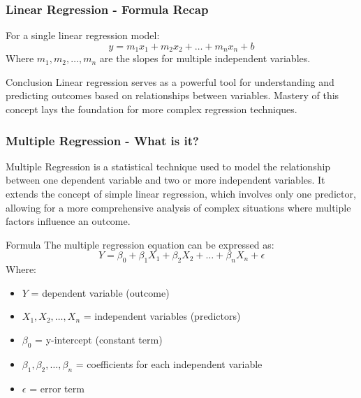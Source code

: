 \documentclass{beamer}
\begin{document}
\begin{frame}[fragile]
    \frametitle{Linear Regression - Formula Recap}
    For a single linear regression model:
    \begin{equation}
    y = m_1 x_1 + m_2 x_2 + \ldots + m_n x_n + b 
    \end{equation}
    Where $m_1, m_2, \ldots, m_n$ are the slopes for multiple independent variables.

    \begin{block}{Conclusion}
    Linear regression serves as a powerful tool for understanding and predicting outcomes based on relationships between variables. Mastery of this concept lays the foundation for more complex regression techniques.
    \end{block}
\end{frame}

\begin{frame}[fragile]
    \frametitle{Multiple Regression - What is it?}
    Multiple Regression is a statistical technique used to model the relationship between one dependent variable and two or more independent variables. It extends the concept of simple linear regression, which involves only one predictor, allowing for a more comprehensive analysis of complex situations where multiple factors influence an outcome.

    \begin{block}{Formula}
        The multiple regression equation can be expressed as:
        \[
        Y = \beta_0 + \beta_1X_1 + \beta_2X_2 + \ldots + \beta_nX_n + \epsilon
        \]
        Where:
        \begin{itemize}
            \item \(Y\) = dependent variable (outcome)
            \item \(X_1, X_2, \ldots, X_n\) = independent variables (predictors)
            \item \(\beta_0\) = y-intercept (constant term)
            \item \(\beta_1, \beta_2, \ldots, \beta_n\) = coefficients for each independent variable
            \item \(\epsilon\) = error term
        \end{itemize}
    \end{block}
\end{frame}
\end{document}
